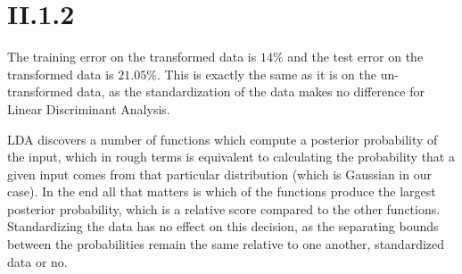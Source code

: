 \section{II.1.2}
The training error on the transformed data is $14\%$ and the test error on
the transformed data is $21.05\%$. This is exactly the same as it is on the
un-transformed data, as the standardization of the data makes no difference
for Linear Discriminant Analysis. 

LDA discovers a number of functions which compute a posterior probability of the input, 
which in rough terms is equivalent to calculating the probability that a given input comes 
from that particular distribution (which is Gaussian in our case). In the end all that matters is
which of the functions produce the largest posterior probability, which is a
relative score compared to the other functions. Standardizing the data has no effect on this decision,
as the separating bounds between the probabilities remain the same relative to one another, standardized 
data or no.

